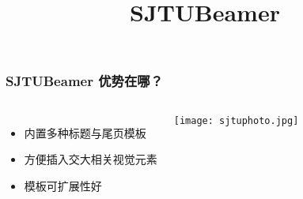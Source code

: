 \documentclass[aspectratio=169,draft]{ctexbeamer}
\begin{document}
\title{SJTUBeamer}
\begin{frame}
  \frametitle{SJTUBeamer 优势在哪？}
  \begin{columns}
    \begin{itemize}
      \item 内置多种标题与尾页模板
      \item 方便插入交大相关视觉元素
      \item 模板可扩展性好
    \end{itemize}
    \texttt{[image: sjtuphoto.jpg]}
  \end{columns}
\end{frame}
\end{document}
